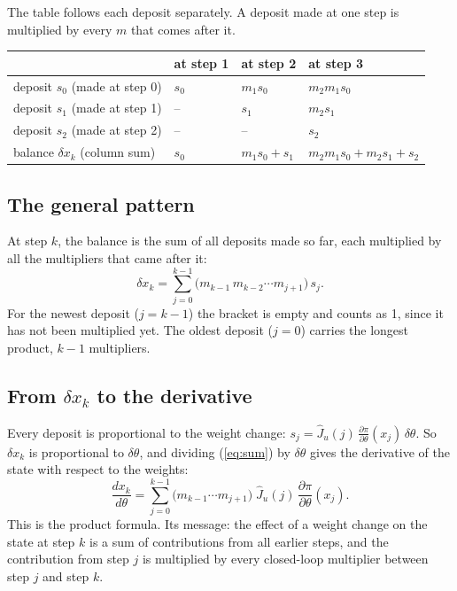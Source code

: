 \documentclass[11pt]{article}
\begin{document}
The table follows each deposit separately. A deposit made at one step is multiplied by every $m$ that comes after it.

\begin{center}
\begin{tabular}{llll}
\toprule
 & at step 1 & at step 2 & at step 3 \\
\midrule
deposit $s_0$ (made at step 0) & $s_0$ & $m_1 s_0$ & $m_2 m_1 s_0$ \\
deposit $s_1$ (made at step 1) & -- & $s_1$ & $m_2 s_1$ \\
deposit $s_2$ (made at step 2) & -- & -- & $s_2$ \\
\midrule
balance $\delta x_k$ (column sum) & $s_0$ & $m_1 s_0+s_1$ & $m_2m_1s_0+m_2s_1+s_2$ \\
\bottomrule
\end{tabular}
\end{center}

\subsection{The general pattern}

At step $k$, the balance is the sum of all deposits made so far, each multiplied by all the multipliers that came after it:
\begin{equation}\label{eq:sum}
\delta x_k=\sum_{j=0}^{k-1}\big(m_{k-1}\,m_{k-2}\cdots m_{j+1}\big)\,s_j .
\end{equation}
For the newest deposit ($j=k-1$) the bracket is empty and counts as 1, since it has not been multiplied yet. The oldest deposit ($j=0$) carries the longest product, $k-1$ multipliers.

\subsection{From $\delta x_k$ to the derivative}

Every deposit is proportional to the weight change: $s_j=\hat J_u(j)\,\frac{\partial\pi}{\partial\theta}(x_j)\,\delta\theta$. So $\delta x_k$ is proportional to $\delta\theta$, and dividing (\ref{eq:sum}) by $\delta\theta$ gives the derivative of the state with respect to the weights:
\begin{equation}\label{eq:product}
\frac{dx_k}{d\theta}=\sum_{j=0}^{k-1}\big(m_{k-1}\cdots m_{j+1}\big)\;\hat J_u(j)\,\frac{\partial\pi}{\partial\theta}(x_j).
\end{equation}
This is the product formula. Its message: the effect of a weight change on the state at step $k$ is a sum of contributions from all earlier steps, and the contribution from step $j$ is multiplied by every closed-loop multiplier between step $j$ and step $k$.
\end{document}

